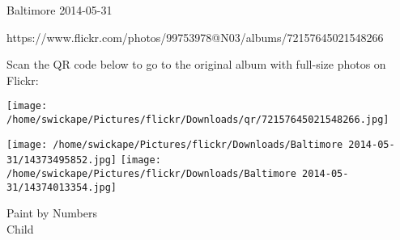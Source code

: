 \documentclass[10pt,letterpaper]{article}
\begin{document}
Baltimore 2014-05-31

https://www.flickr.com/photos/99753978@N03/albums/72157645021548266

Scan the QR code below to go to the original album with full-size photos on Flickr:

\texttt{[image: /home/swickape/Pictures/flickr/Downloads/qr/72157645021548266.jpg]}
\pagebreak

\texttt{[image: /home/swickape/Pictures/flickr/Downloads/Baltimore 2014-05-31/14373495852.jpg]}
\texttt{[image: /home/swickape/Pictures/flickr/Downloads/Baltimore 2014-05-31/14374013354.jpg]}

Paint by Numbers\\
Child\\
\pagebreak
\end{document}
